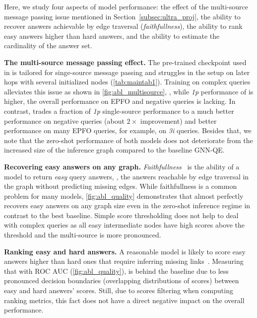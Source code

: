 Here, we study four aspects of model performance: the effect of the multi-source message passing issue mentioned in Section~\ref{subsec:ultra_proj}, the ability to recover answers achievable by edge traversal (\emph{faithfullness}), the ability to rank easy answers higher than hard answers, and the ability to estimate the cardinality of the answer set.

\textbf{The multi-source message passing effect.}
The pre-trained \ultra checkpoint used in \methodlp is tailored for singe-source message passing and struggles in the \clqa setup on later hops with several initialized nodes (\autoref{tab:maintab1}). 
Training \method on complex queries alleviates this issue as shown in \autoref{fig:abl_multisource}, \ie, while \emph{1p} performance of \methodlp is higher, the overall performance on EPFO and negative queries is lacking. 
In contrast, \method trades a fraction of \emph{1p} single-source performance to a much better performance on negative queries (about $2\times$ improvement) and better performance on many EPFO queries, for example, on \emph{3i} queries. 
Besides that, we note that the zero-shot performance of both \method models does not deteriorate from the increased size of the inference graph compared to the baseline GNN-QE.

\textbf{Recovering easy answers on any graph.}
\emph{Faithfullness}~\citep{emql} is the ability of a \clqa model to return \emph{easy} query answers, \ie, the answers reachable by edge traversal in the graph without predicting missing edges.
While faithfullness is a common problem for many \clqa models, \autoref{fig:abl_quality} demonstrates that \method almost perfectly recovers easy answers on any graph size even in the zero-shot inference regime in contrast to the best baseline.
Simple score thresholding does not help \methodlp to deal with complex queries as all easy intermediate nodes have high scores above the threshold and the multi-source is more pronounced. 

\textbf{Ranking easy and hard answers.}
A reasonable \clqa model is likely to score easy answers higher than hard ones that require inferring missing links~\citep{galkin2022}.
Measuring that with ROC AUC  (\autoref{fig:abl_quality}), \method is behind the baseline due to less pronounced decision boundaries (overlapping distributions of scores) between easy and hard answers' scores. 
Still, due to scores filtering when computing ranking metrics, this fact does not have a direct negative impact on the overall performance.

